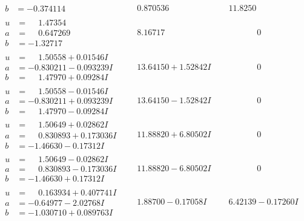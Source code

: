 \documentclass[1p]{elsarticle_modified}
\theoremstyle{definition}
\begin{document}
$$\begin{array}{c|c|c}
\begin{aligned}
b &= -0.374114\phantom{ +0.000000I}\end{aligned}
 & \phantom{-}0.870536\phantom{ +0.000000I} & \phantom{-}11.8250\phantom{ +0.000000I} \\ \hline\begin{aligned}
u &= \phantom{-}1.47354\phantom{ +0.000000I} \\
a &= \phantom{-}0.647269\phantom{ +0.000000I} \\
b &= -1.32717\phantom{ +0.000000I}\end{aligned}
 & \phantom{-}8.16717\phantom{ +0.000000I} & \phantom{-0.000000 } 0 \\ \hline\begin{aligned}
u &= \phantom{-}1.50558 + 0.01546 I \\
a &= -0.830211 - 0.093239 I \\
b &= \phantom{-}1.47970 + 0.09284 I\end{aligned}
 & \phantom{-}13.64150 + 1.52842 I & \phantom{-0.000000 } 0 \\ \hline\begin{aligned}
u &= \phantom{-}1.50558 - 0.01546 I \\
a &= -0.830211 + 0.093239 I \\
b &= \phantom{-}1.47970 - 0.09284 I\end{aligned}
 & \phantom{-}13.64150 - 1.52842 I & \phantom{-0.000000 } 0 \\ \hline\begin{aligned}
u &= \phantom{-}1.50649 + 0.02862 I \\
a &= \phantom{-}0.830893 + 0.173036 I \\
b &= -1.46630 - 0.17312 I\end{aligned}
 & \phantom{-}11.88820 + 6.80502 I & \phantom{-0.000000 } 0 \\ \hline\begin{aligned}
u &= \phantom{-}1.50649 - 0.02862 I \\
a &= \phantom{-}0.830893 - 0.173036 I \\
b &= -1.46630 + 0.17312 I\end{aligned}
 & \phantom{-}11.88820 - 6.80502 I & \phantom{-0.000000 } 0 \\ \hline\begin{aligned}
u &= \phantom{-}0.163934 + 0.407741 I \\
a &= -0.64977 - 2.02768 I \\
b &= -1.030710 + 0.089763 I\end{aligned}
 & \phantom{-}1.88700 - 0.17058 I & \phantom{-}6.42139 - 0.17260 I \\ \hline\begin{aligned}

\end{aligned}
\end{array}$$
\end{document}
